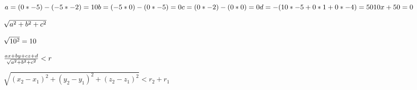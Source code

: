 \documentclass{article}
\begin{document}
\noindent
$
a = (0 * -5) - (-5 * -2) = 10\\
b = (-5 * 0) - (0 * -5) = 0 \\
c = (0 * -2) - (0 * 0) = 0 \\
d = -(10 * -5 + 0 * 1 + 0 * -4) = 50 \\ \\ \\
10x + 50 = 0 \\ \\
$

$
\sqrt{a^2 + b^2 + c^2} \\ \\
$

$
\sqrt{10^2} = 10 \\ \\
$

$
\frac{ax + by + cz + d}{\sqrt{a^2 + b^2 + c^2}} < r \\ \\
$

$
\sqrt{(x_2 - x_1)^2 + (y_2 - y_1)^2 + (z_2 - z_1)^2} < r_2 + r_1
$
\end{document}
